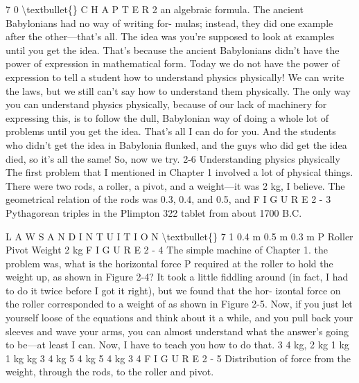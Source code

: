 \documentclass[10pt,oneside]{article}
\begin{document}
7 0 \textbackslash{}textbullet\{\} C H A P T E R  2 an algebraic formula. The ancient Babylonians had no way of writing for- mulas; instead, they did one example after the other---that’s all. The idea was you’re supposed to look at examples until you get the idea. That’s because the ancient Babylonians didn’t have the power of expression in mathematical form. Today we do not have the power of expression to tell a student how to understand physics physically! We can write the laws, but we still can’t say how to understand them physically. The only way you can understand physics physically, because of our lack of machinery for expressing this, is to follow the dull, Babylonian way of doing a whole lot of problems until you get the idea. That’s all I can do for you. And the students who didn’t get the idea in Babylonia flunked, and the guys who did get the idea died, so it’s all the same! So, now we try. 2-6 Understanding physics physically The first problem that I mentioned in Chapter 1 involved a lot of physical things. There were two rods, a roller, a pivot, and a weight---it was 2 kg, I believe. The geometrical relation of the rods was 0.3, 0.4, and 0.5, and F I G U R E  2 - 3 Pythagorean triples in the Plimpton 322 tablet from about 1700 B.C.\par

L A W S  A N D  I N T U I T I O N \textbackslash{}textbullet\{\} 7 1 0.4 m 0.5 m 0.3 m P Roller Pivot Weight 2 kg F I G U R E  2 - 4 The simple machine of Chapter 1. the problem was, what is the horizontal force P required at the roller to hold the weight up, as shown in Figure 2-4? It took a little fiddling around (in fact, I had to do it twice before I got it right), but we found that the hor- izontal force on the roller corresponded to a weight of as shown in Figure 2-5. Now, if you just let yourself loose of the equations and think about it a while, and you pull back your sleeves and wave your arms, you can almost understand what the answer’s going to be---at least I can. Now, I have to teach you how to do that. 3 4 kg, 2 kg 1 kg 1 kg kg 3 4 kg 5 4 kg 5 4 kg 3 4 F I G U R E  2 - 5 Distribution of force from the weight, through the rods, to the roller and pivot.\par
\end{document}
